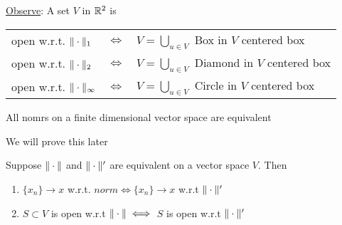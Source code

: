 \underline{Observe}: A set $V$ in $\mathbb{R}^2$ is
\begin{center}
	\begin{tabular}{lcl}
		open w.r.t. $\|\cdot\|_1$ & $\iff$ & $V=\bigcup\limits_{u\in V}$ Box in $V$ centered box\\
		open w.r.t. $\|\cdot\|_2$ & $\iff$ & $V=\bigcup\limits_{u\in V}$ Diamond in $V$ centered box\\
		open w.r.t. $\|\cdot\|_{\infty}$ & $\iff$ & $V=\bigcup\limits_{u\in V}$ Circle in $V$ centered box
	\end{tabular}
\end{center}
\begin{theorem}{}{}
	All nomrs on a finite dimensional vector space are equivalent
\end{theorem}
\begin{myproof}
	We will prove this later
\end{myproof}
\begin{theorem}{}{}
	Suppose $\|\cdot\|$ and $\|\cdot\|'$ are equivalent on a vector space $V$. Then \begin{enumerate}[label=(\roman*)]
		\item $\{x_n\}\to x$ w.r.t. $norm\iff \{x_n\}\to x$ w.r.t $\|\cdot\|'$
		\item $S\subset V$ is open w.r.t $\|\cdot\|\iff$ $S$ is open w.r.t $\|\cdot\|'$
	\end{enumerate}
\end{theorem}

